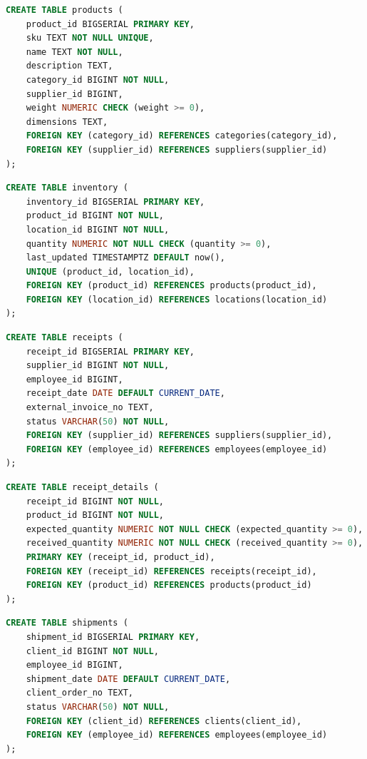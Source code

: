 \begin{lstlisting}[language=SQL, caption={Definicja tabeli products}]
CREATE TABLE products (
    product_id BIGSERIAL PRIMARY KEY,
    sku TEXT NOT NULL UNIQUE,
    name TEXT NOT NULL,
    description TEXT,
    category_id BIGINT NOT NULL,
    supplier_id BIGINT,
    weight NUMERIC CHECK (weight >= 0),
    dimensions TEXT,
    FOREIGN KEY (category_id) REFERENCES categories(category_id),
    FOREIGN KEY (supplier_id) REFERENCES suppliers(supplier_id)
);
\end{lstlisting}

\begin{lstlisting}[language=SQL, caption={Definicja tabeli inventory}]
CREATE TABLE inventory (
    inventory_id BIGSERIAL PRIMARY KEY,
    product_id BIGINT NOT NULL,
    location_id BIGINT NOT NULL,
    quantity NUMERIC NOT NULL CHECK (quantity >= 0),
    last_updated TIMESTAMPTZ DEFAULT now(),
    UNIQUE (product_id, location_id),
    FOREIGN KEY (product_id) REFERENCES products(product_id),
    FOREIGN KEY (location_id) REFERENCES locations(location_id)
);
\end{lstlisting}

\begin{lstlisting}[language=SQL, caption={Definicja tabeli receipts}]
CREATE TABLE receipts (
    receipt_id BIGSERIAL PRIMARY KEY,
    supplier_id BIGINT NOT NULL,
    employee_id BIGINT,
    receipt_date DATE DEFAULT CURRENT_DATE,
    external_invoice_no TEXT,
    status VARCHAR(50) NOT NULL,
    FOREIGN KEY (supplier_id) REFERENCES suppliers(supplier_id),
    FOREIGN KEY (employee_id) REFERENCES employees(employee_id)
);
\end{lstlisting}

\begin{lstlisting}[language=SQL, caption={Definicja tabeli receipt\_details}]
CREATE TABLE receipt_details (
    receipt_id BIGINT NOT NULL,
    product_id BIGINT NOT NULL,
    expected_quantity NUMERIC NOT NULL CHECK (expected_quantity >= 0),
    received_quantity NUMERIC NOT NULL CHECK (received_quantity >= 0),
    PRIMARY KEY (receipt_id, product_id),
    FOREIGN KEY (receipt_id) REFERENCES receipts(receipt_id),
    FOREIGN KEY (product_id) REFERENCES products(product_id)
);
\end{lstlisting}

\begin{lstlisting}[language=SQL, caption={Definicja tabeli shipments}]
CREATE TABLE shipments (
    shipment_id BIGSERIAL PRIMARY KEY,
    client_id BIGINT NOT NULL,
    employee_id BIGINT,
    shipment_date DATE DEFAULT CURRENT_DATE,
    client_order_no TEXT,
    status VARCHAR(50) NOT NULL,
    FOREIGN KEY (client_id) REFERENCES clients(client_id),
    FOREIGN KEY (employee_id) REFERENCES employees(employee_id)
);
\end{lstlisting}

